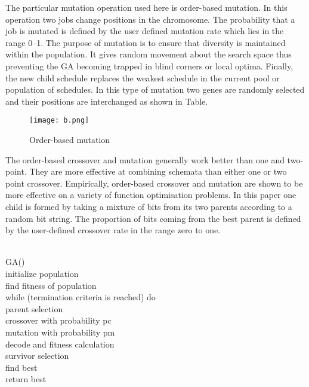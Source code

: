 \documentclass[a4paper,12pt]{report}
\begin{document}
{{{\begin{itemize}
		\par The particular mutation operation used here is order-based mutation. In this operation two jobs change positions in the chromosome. The probability that a job is mutated is defined by the user defined mutation rate which lies in the range 0–1. The purpose of mutation is to ensure that diversity is maintained within the population. It gives random movement about the search space thus preventing the GA becoming trapped in blind corners or local optima. Finally, the new child schedule replaces the weakest schedule in the current pool or population of schedules. In this type of mutation two genes are randomly selected and their positions are interchanged as shown in Table.
		
			
		\begin{figure}[h]
			\begin{center}
				\texttt{[image: b.png]}\\
			\end{center}
			\caption{Order-based mutation}
		\end{figure}
		
	\par	The order-based crossover and mutation generally work better than one and two-point. They are more effective at combining schemata than either one or two point crossover. Empirically, order-based crossover and mutation are shown to be more effective on a variety of function optimisation problems. In this paper one child is formed by taking a mixture of bits from its two parents according to a random bit string. The proportion of bits coming from the best parent is defined by the user-defined crossover rate in the range zero to one.
		
		
				\caption\textbf{Algorithm:}\\
				GA()\\
				initialize population\\
				find fitness of population\\
				while (termination criteria is reached) do\\
				parent selection\\
				crossover with probability pc\\
				mutation with probability pm\\
				decode and fitness calculation\\
				survivor selection\\
				find best\\
				return best\\
				

\end{itemize}}}}
\end{document}
